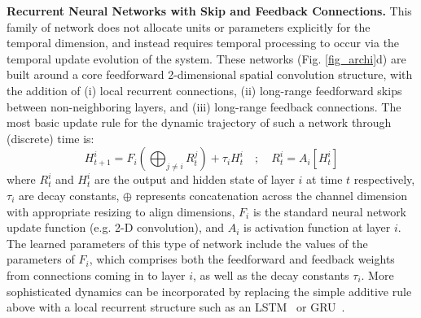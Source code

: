 \textbf{Recurrent Neural Networks with Skip and Feedback Connections.} This family of network does not allocate units or parameters explicitly for the temporal dimension, and instead requires temporal processing to occur via the temporal update evolution of the system.  These networks (Fig. \ref{fig_archi}d) are built around a core feedforward 2-dimensional spatial convolution structure, with the addition of (i) local recurrent connections, (ii) long-range feedforward skips between non-neighboring layers, and (iii) long-range feedback connections.  
The most basic update rule for the dynamic trajectory of such a network through (discrete) time is: 
$$H^i_{t+1} = F_i \left ( \bigoplus_{j \neq i} R^j_t \right )  + \tau_i H^i_t \quad ;\quad R^i_t = A_i[H^i_t]$$
where $R^i_t$ and $H^i_t$ are the output and hidden state of layer $i$ at time $t$ respectively,  $\tau_i$  are decay constants, $\oplus$ represents concatenation across the channel dimension with appropriate resizing to align dimensions, $F_i$ is the standard neural network update function (e.g. 2-D convolution), and $A_i$ is activation function at layer $i$.  
The learned parameters of this type of network include the values of the parameters of $F_i$, which comprises both the feedforward and feedback weights from connections coming in to layer $i$, as well as the decay constants $\tau_i$. 
More sophisticated dynamics can be incorporated by replacing the simple additive rule above with a local recurrent structure such as an LSTM~\cite{Hochreiter1997} or GRU~\cite{cho2014properties}.


